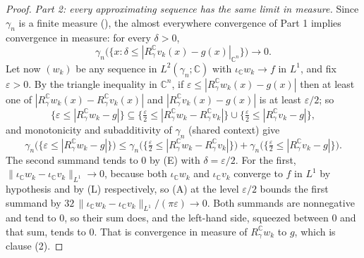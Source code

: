 \begin{proof}
\emph{Part 2: every approximating sequence has the same limit in measure.}
Since $\gamma_n$ is a finite measure (), the almost
everywhere convergence of Part 1 implies convergence in measure: for every
$\delta > 0$,
\begin{equation*}
  \gamma_n\bigl(\{x : \delta \leq |R_\gamma^{\mathbb{C}} v_k(x)
    - g(x)|_{\mathbb{C}^n}\}\bigr) \longrightarrow 0 . \tag{E}
\end{equation*}
Let now $(w_k)$ be any sequence in $L^2(\gamma_n;\mathbb{C})$ with
$\iota_{\mathbb{C}} w_k \to f$ in $L^1$, and fix $\varepsilon > 0$.  By the
triangle inequality in $\mathbb{C}^n$, if
$\varepsilon \leq |R_\gamma^{\mathbb{C}} w_k(x) - g(x)|$ then at least one of
$|R_\gamma^{\mathbb{C}} w_k(x) - R_\gamma^{\mathbb{C}} v_k(x)|$ and
$|R_\gamma^{\mathbb{C}} v_k(x) - g(x)|$ is at least $\varepsilon/2$; so
\[
  \{\varepsilon \leq |R_\gamma^{\mathbb{C}} w_k - g|\}
    \subseteq \{\tfrac{\varepsilon}{2}
        \leq |R_\gamma^{\mathbb{C}} w_k - R_\gamma^{\mathbb{C}} v_k|\}
      \cup \{\tfrac{\varepsilon}{2} \leq |R_\gamma^{\mathbb{C}} v_k - g|\} ,
\]
and monotonicity and subadditivity of $\gamma_n$ (shared context) give
\[
  \gamma_n\bigl(\{\varepsilon \leq |R_\gamma^{\mathbb{C}} w_k - g|\}\bigr)
    \leq \gamma_n\bigl(\{\tfrac{\varepsilon}{2}
          \leq |R_\gamma^{\mathbb{C}} w_k - R_\gamma^{\mathbb{C}} v_k|\}\bigr)
      + \gamma_n\bigl(\{\tfrac{\varepsilon}{2}
          \leq |R_\gamma^{\mathbb{C}} v_k - g|\}\bigr) .
\]
The second summand tends to $0$ by (E) with $\delta = \varepsilon/2$.  For the
first, $\|\iota_{\mathbb{C}} w_k - \iota_{\mathbb{C}} v_k\|_{L^1} \to 0$, because
both $\iota_{\mathbb{C}} w_k$ and $\iota_{\mathbb{C}} v_k$ converge to $f$ in
$L^1$ by hypothesis and by (L) respectively, so (A) at the level
$\varepsilon/2$ bounds the first summand by
$32\,\|\iota_{\mathbb{C}} w_k - \iota_{\mathbb{C}} v_k\|_{L^1}/(\pi\varepsilon)
 \to 0$.  Both summands are nonnegative and tend to $0$, so their sum does, and
the left-hand side, squeezed between $0$ and that sum, tends to $0$.  That is
convergence in measure of $R_\gamma^{\mathbb{C}} w_k$ to $g$, which is
clause (2).
\end{proof}
